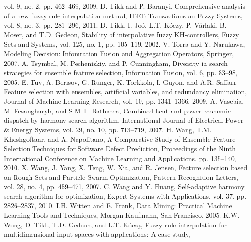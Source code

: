 vol. 9, no. 2, pp. 462--469,
2009.
D. Tikk and P. Baranyi,
Comprehensive analysis of a new fuzzy rule interpolation method,
IEEE Transactions on Fuzzy Systems,
vol. 8, no. 3, pp. 281--296,
2011.
D. Tikk, I. Jo\'{o}, L.T. K\'{o}czy, P. V\'{a}rlaki, B. Moser, and T.D. Gedeon,
Stability of interpolative fuzzy KH-controllers,
Fuzzy Sets and Systems,
vol. 125, no. 1, pp. 105--119,
2002.
V. Torra and Y. Narukawa,
Modeling Decision: Infomration Fusion and Aggregation Operators,
Springer,
2007.
A. Tsymbal, M. Pechenizkiy, and P. Cunningham,
Diversity in search strategies for ensemble feature selection,
Information Fusion,
vol. 6, pp. 83--98,
2005.
E. Tuv, A. Borisov, G. Runger, K. Torkkola, I. Guyon, and A.R. Saffari,
Feature selection with ensembles, artificial variables, and redundancy elimination,
Journal of Machine Learning Research,
vol. 10, pp. 1341--1366,
2009.
A. Vasebia, M. Fesangharyb, and S.M.T. Bathaeea,
Combined heat and power economic dispatch by harmony search algorithm,
International Journal of Electrical Power \& Energy Systems,
vol. 29, no. 10, pp. 713--719,
2007.
H. Wang, T.M. Khoshgoftaar, and A. Napolitano,
A Comparative Study of Ensemble Feature Selection Techniques for Software Defect Prediction,
Proceedings of the Ninth International Conference on Machine Learning and Applications,
pp. 135--140,
2010.
X. Wang, J. Yang, X. Teng, W. Xia, and R. Jensen,
Feature selection based on Rough Sets and Particle Swarm Optimization,
Pattern Recognition Letters,
vol. 28, no. 4, pp. 459--471,
2007.
C. Wang and Y. Huang,
Self-adaptive harmony search algorithm for optimization,
Expert Systems with Applications,
vol. 37, pp. 2826--2837,
2010.
I.H. Witten and E. Frank,
Data Mining: Practical Machine Learning Tools and Techniques,
Morgan Kaufmann, San Francisco,
2005.
K.W. Wong, D. Tikk, T.D. Gedeon, and L.T. K\'{o}czy,
Fuzzy rule interpolation for multidimensional input spaces with applications: A case study,
